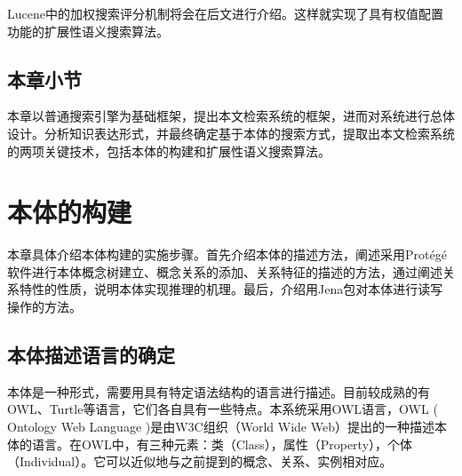 \documentclass[12pt,a4paper]{article}
\begin{document}
	{\Times Lucene}中的加权搜索评分机制将会在后文进行介绍。这样就实现了具有权值配置功能的扩展性语义搜索算法。

	\subsection{本章小节}
	本章以普通搜索引擎为基础框架，提出本文检索系统的框架，进而对系统进行总体设计。分析知识表达形式，并最终确定基于本体的搜索方式，提取出本文检索系统的两项关键技术，包括本体的构建和扩展性语义搜索算法。

\newpage
\section{本体的构建}
\setcounter{figure}{0}
\setcounter{table}{0}
\setcounter{equation}{0}
	本章具体介绍本体构建的实施步骤。首先介绍本体的描述方法，阐述采用{\Times Prot{\'e}g{\'e}}软件进行本体概念树建立、概念关系的添加、关系特征的描述的方法，通过阐述关系特性的性质，说明本体实现推理的机理。最后，介绍用Jena包对本体进行读写操作的方法。

	\subsection{本体描述语言的确定}

	本体是一种形式，需要用具有特定语法结构的语言进行描述。目前较成熟的有{\Times OWL}、{\Times Turtle}等语言，它们各自具有一些特点。本系统采用{\Times OWL}语言，{\Times OWL ( Ontology Web Language )}是由{\Times W3C}组织（{\Times World Wide Web}）提出的一种描述本体的语言。在{\Times OWL}中，有三种元素：类（{\Times Class}），属性（{\Times Property}），个体（{\Times Individual}）。它可以近似地与之前提到的概念、关系、实例相对应。
\end{document}
